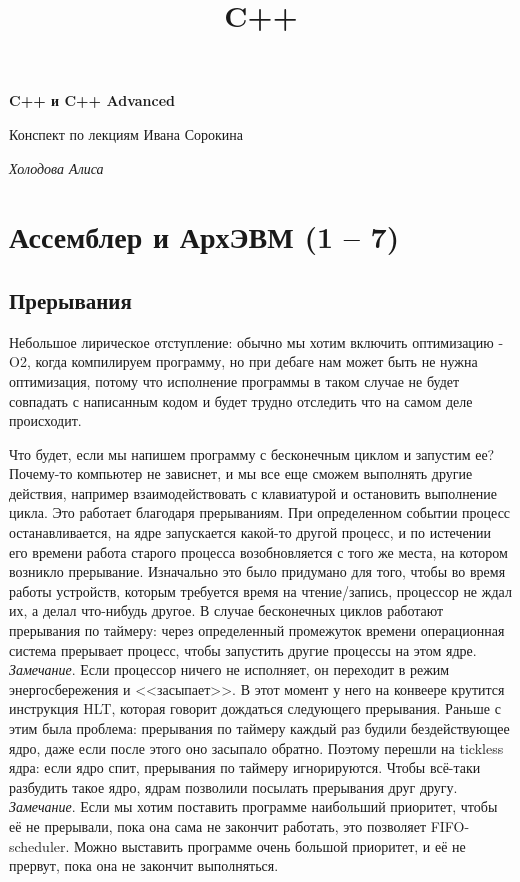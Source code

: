 \documentclass[12pt, a4paper]{article}
\title{C++}
\begin{document}
	\begin{titlepage}
		\begin{center}
			\vspace*{1cm}
			
			\huge
			\textbf{C++ и C++ Advanced}
			
			\vspace{0.5cm}
			\LARGE
			Конспект по лекциям Ивана Сорокина
			
			\vspace{1.5cm}
			\large
			\textit{Холодова Алиса}
			
			\vfill
			
		\end{center}
	\end{titlepage}
	\section{Ассемблер и АрхЭВМ (1 -- 7)}
	\subsection{Прерывания}
	Небольшое лирическое отступление: обычно мы хотим включить оптимизацию -O2, когда компилируем программу, но при дебаге нам может быть не нужна оптимизация, потому что исполнение программы в таком случае не будет совпадать с написанным кодом и будет трудно отследить что на самом деле происходит.
	\\\par Что будет, если мы напишем программу с бесконечным циклом и запустим ее? Почему-то компьютер не зависнет, и мы все еще сможем выполнять другие действия, например взаимодействовать с клавиатурой и остановить выполнение цикла. Это работает благодаря прерываниям. При определенном событии процесс останавливается, на ядре запускается какой-то другой процесс, и по истечении его времени работа старого процесса возобновляется с того же места, на котором возникло прерывание. Изначально это было придумано для того, чтобы во время работы устройств, которым требуется время на чтение/запись, процессор не ждал их, а делал что-нибудь другое. В случае бесконечных циклов работают прерывания по таймеру: через определенный промежуток времени операционная система прерывает процесс, чтобы запустить другие процессы на этом ядре.\\\textit{Замечание}. Если процессор ничего не исполняет, он переходит в режим энергосбережения и <<засыпает>>. В этот момент у него на конвеере крутится инструкция HLT, которая говорит дождаться следующего прерывания. Раньше с этим была проблема: прерывания по таймеру каждый раз будили бездействующее ядро, даже если после этого оно засыпало обратно. Поэтому перешли на tickless ядра: если ядро спит, прерывания по таймеру игнорируются. Чтобы всё-таки разбудить такое ядро, ядрам позволили посылать прерывания друг другу.\\
	\textit{Замечание}. Если мы хотим поставить программе наибольший приоритет, чтобы её не прерывали, пока она сама не закончит работать, это позволяет FIFO-scheduler. Можно выставить программе очень большой приоритет, и её не прервут, пока она не закончит выполняться.
\end{document}
